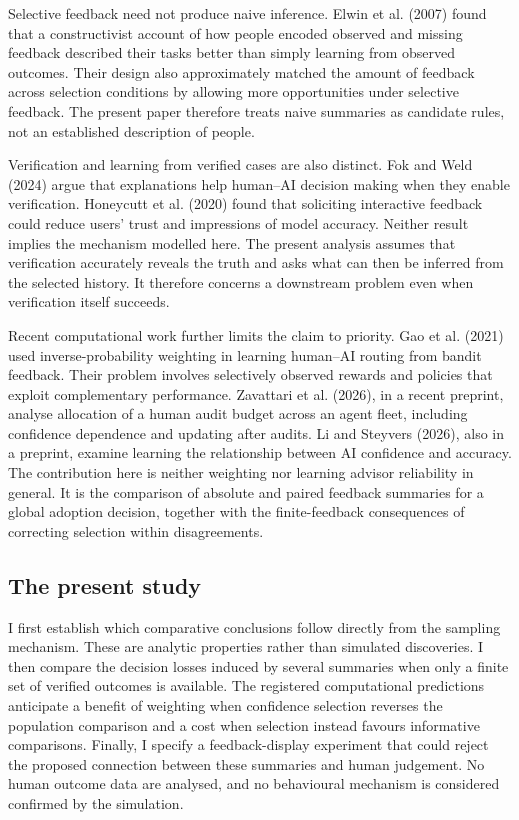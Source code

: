 \documentclass[
  british,
  11pt,
]{article}
\begin{document}
Selective feedback need not produce naive inference. Elwin et al. (2007)
found that a constructivist account of how people encoded observed and
missing feedback described their tasks better than simply learning from
observed outcomes. Their design also approximately matched the amount of
feedback across selection conditions by allowing more opportunities
under selective feedback. The present paper therefore treats naive
summaries as candidate rules, not an established description of people.

Verification and learning from verified cases are also distinct. Fok and
Weld (2024) argue that explanations help human--AI decision making when
they enable verification. Honeycutt et al. (2020) found that soliciting
interactive feedback could reduce users' trust and impressions of model
accuracy. Neither result implies the mechanism modelled here. The
present analysis assumes that verification accurately reveals the truth
and asks what can then be inferred from the selected history. It
therefore concerns a downstream problem even when verification itself
succeeds.

Recent computational work further limits the claim to priority. Gao et
al. (2021) used inverse-probability weighting in learning human--AI
routing from bandit feedback. Their problem involves selectively
observed rewards and policies that exploit complementary performance.
Zavattari et al. (2026), in a recent preprint, analyse allocation of a
human audit budget across an agent fleet, including confidence
dependence and updating after audits. Li and Steyvers (2026), also in a
preprint, examine learning the relationship between AI confidence and
accuracy. The contribution here is neither weighting nor learning
advisor reliability in general. It is the comparison of absolute and
paired feedback summaries for a global adoption decision, together with
the finite-feedback consequences of correcting selection within
disagreements.

\subsection{The present study}\label{the-present-study}

I first establish which comparative conclusions follow directly from the
sampling mechanism. These are analytic properties rather than simulated
discoveries. I then compare the decision losses induced by several
summaries when only a finite set of verified outcomes is available. The
registered computational predictions anticipate a benefit of weighting
when confidence selection reverses the population comparison and a cost
when selection instead favours informative comparisons. Finally, I
specify a feedback-display experiment that could reject the proposed
connection between these summaries and human judgement. No human outcome
data are analysed, and no behavioural mechanism is considered confirmed
by the simulation.
\end{document}
